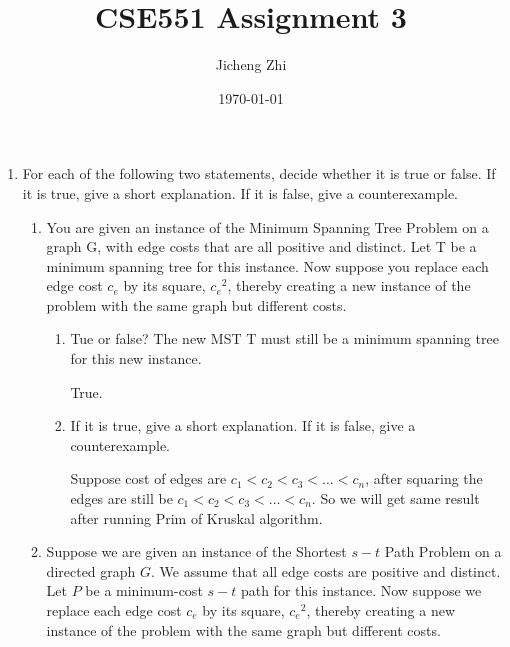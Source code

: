 \documentclass[14pt, a4paper]{article}
\title{CSE551 Assignment 3}
\author{Jicheng Zhi}
\date{\today}
\begin{document}
\maketitle

\begin{enumerate}

\item For each of the following two statements, decide whether it is true or false. If it is true, give a short explanation. If it is false, give a counterexample.\\

    \begin{enumerate}[label*=\arabic*]
    
        \item You are given an instance of the Minimum Spanning Tree Problem 
        on a graph G, with edge costs that are all positive and distinct. 
        Let T be a minimum spanning tree for this instance. 
        Now suppose you replace each edge cost $c_e$ by its square, ${c_e}^2$, 
        thereby creating a new instance of the problem 
        with the same graph but different costs.
        
        \begin{enumerate}[label*=\arabic*]
            \item  Tue or false? The new MST T must still be 
            a minimum spanning tree for this new instance.
            
            True.
            
            \item If it is true, give a short explanation. If it is false, give a counterexample.
            
            Suppose cost of edges are $c_1 < c_2 < c_3 < \ldots < c_n$, after squaring the edges are still 
            be $c_1 < c_2 < c_3 < \ldots < c_n$. So we will get same result after running Prim of Kruskal algorithm.
            
        \end{enumerate}
        
        \item Suppose we are given an instance of the Shortest $s - t$ Path Problem 
        on a directed graph $G$. We assume that all edge costs are positive and distinct. Let $P$ be a minimum-cost $s - t$ path for this instance. 
        Now suppose we replace each edge cost $c_e$ by its square, ${c_e}^2$, 
        thereby creating a new instance of the problem 
        with the same graph but different costs.
        

\end{enumerate}
\end{enumerate}
\end{document}
